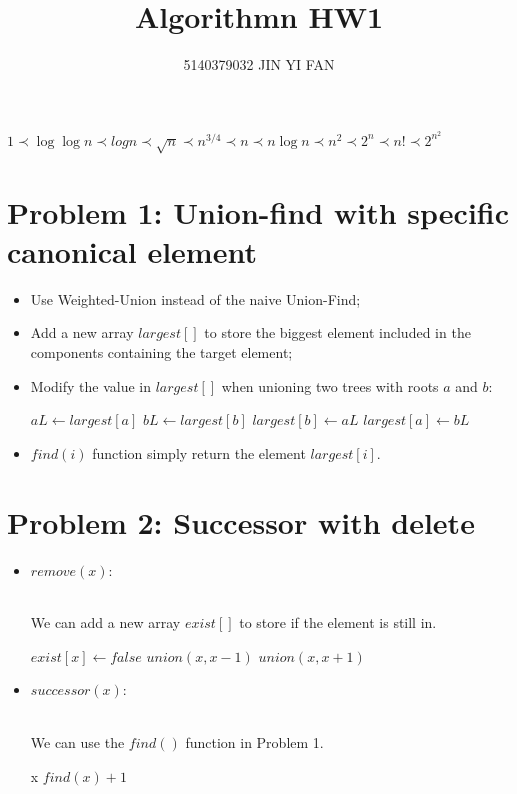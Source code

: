 \documentclass[a4paper]{article}
\title{\textbf{Algorithmn HW1}}
\author{5140379032 JIN YI FAN}
\date{}
\begin{document}
\large
\maketitle
\begin{spacing}{1.3}
$1\prec \log\log n \prec log n\prec \sqrt{n}\prec n^{3/4} \prec n \prec n\log n \prec n^2 \prec 2^n \prec n!\prec 2^{n^2}$

\section*{Problem 1: Union-find with specific canonical element}
\begin{itemize}
\item Use Weighted-Union instead of the naive Union-Find;
\item Add a new array $largest[]$ to store the biggest element included in the components containing the target element;
\item {Modify the value in $largest[]$ when unioning two trees with roots $a$ and $b$:
\begin{algorithmic}[1]
\STATE $aL \gets largest[a]$
\STATE $bL \gets largest[b]$
\STATE $largest[b] \gets aL$
\ELSE
\STATE $largest[a] \gets bL$
\ENDIF
\end{algorithmic}
}
\item $find(i)$ function simply return the element $largest[i]$. 
\end{itemize}
\section*{Problem 2: Successor with delete}
\begin{itemize}
\item $remove(x):${
	\\We can add a new array $exist[]$ to store if the element is still in.
	\begin{algorithmic}[1]
	\STATE $exist[x] \gets false$
	\STATE $union(x,x-1)$ \ENDIF
	\STATE $union(x,x+1)$ \ENDIF
	\end{algorithmic}
}
\item $successor(x):${
	\\We can use the $find()$ function in Problem 1.
	\begin{algorithmic}[1]
	\RETURN x
	\ELSE
	\RETURN $find(x)+1$ \ENDIF
	\end{algorithmic}
}
\end{itemize}


\end{spacing}
\end{document}
